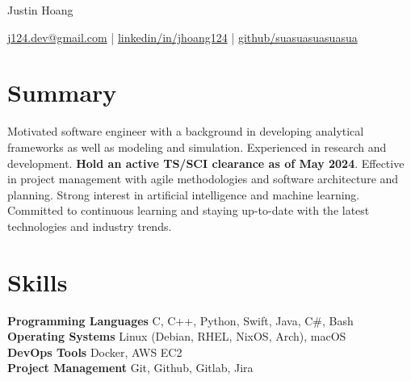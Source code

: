 \documentclass[11pt]{article}       %
\begin{document}
\centerline{\Huge Justin Hoang}

\vspace{5pt}

\centerline{
	\href{mailto:j124.dev@gmail.com}{j124.dev@gmail.com}
	| \href{https://www.linkedin.com/in/jhoang124/}{linkedin/in/jhoang124}
	| \href{https://github.com/suasuasuasuasua}{github/suasuasuasuasua}
}

\vspace{-10pt}

\section*{Summary}
Motivated software engineer with a background in developing analytical
frameworks as well as modeling and simulation. Experienced in research and
development. \textbf{Hold an active TS/SCI clearance as of May 2024}. Effective
in project management with agile methodologies and software architecture and
planning. Strong interest in artificial intelligence and machine learning.
Committed to continuous learning and staying up-to-date with the latest
technologies and industry trends.
\vspace{-6.5pt}

\section*{Skills}
\textbf{Programming Languages} C, C++, Python, Swift, Java, C\#, Bash \\
\textbf{Operating Systems} Linux (Debian, RHEL, NixOS, Arch), macOS \\
\textbf{DevOps Tools} Docker, AWS EC2 \\
\textbf{Project Management} Git, Github, Gitlab, Jira \\

\vspace{-6.5pt}
\end{document}
